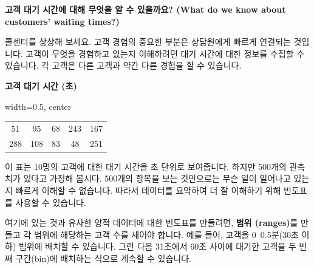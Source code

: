 \documentclass[11pt,a4paper]{book}
\providecommand{\captionof}[2]{\textbf{#2}}
\theoremstyle{definition}
\begin{document}
\begin{tcolorbox}[title={양적 데이터에 대한 빈도표 (Frequency Table for Quantitative Data)}]
\textbf{고객 대기 시간에 대해 무엇을 알 수 있을까요? (What do we know about customers’ waiting times?)}

콜센터를 상상해 보세요. 고객 경험의 중요한 부분은 상담원에게 빠르게 연결되는 것입니다. 고객이 무엇을 경험하고 있는지 이해하려면 대기 시간에 대한 정보를 수집할 수 있습니다. 각 고객은 다른 고객과 약간 다른 경험을 할 수 있습니다.

\begin{center}
\captionof{table}{고객 대기 시간 (초)}
\label{tab:customer_waiting_time_raw}
\begin{adjustbox}{width=0.5\textwidth, center}
\begin{tabular}{ccccc}
\toprule
51 & 95 & 68 & 243 & 167 \\
288 & 108 & 83 & 48 & 251 \\
\bottomrule
\end{tabular}
\end{adjustbox}
\end{center}
이 표는 10명의 고객에 대한 대기 시간을 초 단위로 보여줍니다. 하지만 500개의 관측치가 있다고 가정해 봅시다. 500개의 항목을 보는 것만으로는 무슨 일이 일어나고 있는지 빠르게 이해할 수 없습니다. 따라서 데이터를 요약하여 더 잘 이해하기 위해 빈도표를 사용할 수 있습니다.

여기에 있는 것과 유사한 양적 데이터에 대한 빈도표를 만들려면, \textbf{범위 (ranges)}를 만들고 각 범위에 해당하는 고객 수를 세어야 합니다. 예를 들어, 고객을 0~0.5분(30초 이하) 범위에 배치할 수 있습니다. 그런 다음 31초에서 60초 사이에 대기한 고객을 두 번째 구간(bin)에 배치하는 식으로 계속할 수 있습니다.


\end{tcolorbox}
\end{document}
